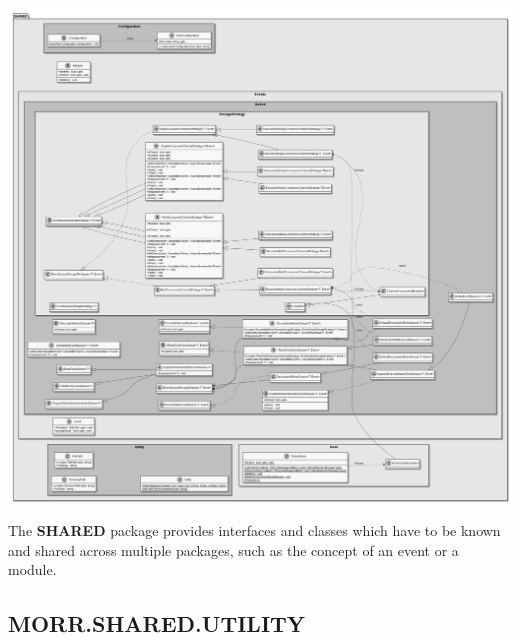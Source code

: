 \begin{center}
    \includegraphics[width=1.0\textwidth]{resources/Packages/SHARED.png}
\end{center}

The \textbf{SHARED} package provides interfaces and classes which have to be known and shared across multiple packages, such as the concept of an event or a module.

\begin{packif}
\end{packif}


\begin{packpack}
\end{packpack}

\subsection{MORR.SHARED.UTILITY}
\begin{packclass}
\end{packclass}

